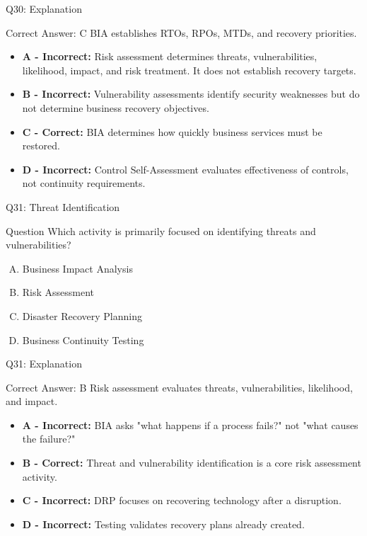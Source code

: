 \documentclass{beamer}
\begin{document}
	\begin{frame}{Q30: Explanation}
		\begin{block}{Correct Answer: C}
			BIA establishes RTOs, RPOs, MTDs, and recovery priorities.
		\end{block}
		
		\begin{itemize}
			\item \textbf{A - Incorrect:} Risk assessment determines threats, vulnerabilities, likelihood, impact, and risk treatment. It does not establish recovery targets.
			\item \textbf{B - Incorrect:} Vulnerability assessments identify security weaknesses but do not determine business recovery objectives.
			\item \textbf{C - Correct:} BIA determines how quickly business services must be restored.
			\item \textbf{D - Incorrect:} Control Self-Assessment evaluates effectiveness of controls, not continuity requirements.
		\end{itemize}
	\end{frame}
	
	\begin{frame}{Q31: Threat Identification}
		\begin{block}{Question}
			Which activity is primarily focused on identifying threats and vulnerabilities?
		\end{block}
		
		\begin{enumerate}[(A)]
			\item Business Impact Analysis
			\item Risk Assessment
			\item Disaster Recovery Planning
			\item Business Continuity Testing
		\end{enumerate}
	\end{frame}
	
	\begin{frame}{Q31: Explanation}
		\begin{block}{Correct Answer: B}
			Risk assessment evaluates threats, vulnerabilities, likelihood, and impact.
		\end{block}
		
		\begin{itemize}
			\item \textbf{A - Incorrect:} BIA asks "what happens if a process fails?" not "what causes the failure?"
			\item \textbf{B - Correct:} Threat and vulnerability identification is a core risk assessment activity.
			\item \textbf{C - Incorrect:} DRP focuses on recovering technology after a disruption.
			\item \textbf{D - Incorrect:} Testing validates recovery plans already created.
		\end{itemize}
	\end{frame}
	
\end{document}
